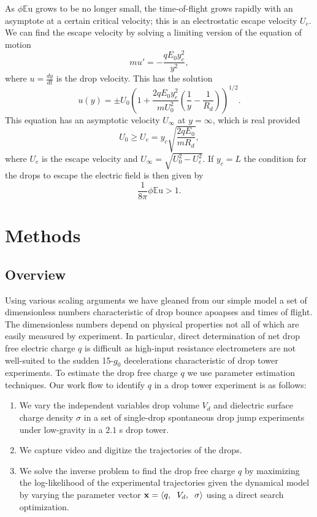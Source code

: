 \documentclass[aip,reprint, floatfix]{revtex4-1}
\begin{document}
As $\phi \mathbb{E}\mbox{u}$ grows to be no longer small, the time-of-flight grows rapidly with an asymptote at a certain critical velocity; this is an electrostatic escape velocity $U_e$. We can find the escape velocity by solving a limiting version of the equation of motion
\[ m u' = - \frac{q E_0 y_c^2}{y^2}, \]
where $u = \frac{d y}{d t}$ is the drop velocity. This has the solution
\[ u(y) = \pm U_0 \left(1 + \frac{2q E_0 y_c^2}{m U_0^2} \left( \frac{1}{y} - \frac{1}{R_d} \right) \right)^{1/2}.
\]
This equation has an asymptotic velocity $U_{\infty}$ at $y = \infty$, which is real provided 
\[ U_0 \geq  U_e = y_c \sqrt{\frac{2 q E_0 }{m R_d}},
\]
where $U_e$ is the escape velocity and $U_{\infty} = \sqrt{U_0^2 - U_e^2}$. If $y_c=L$ the condition for the drops to escape the electric field is then given by
\begin{equation}\label{escape}
\frac{1}{8 \pi} \phi \mathbb{E}\mbox{u} > 1.
\end{equation}

\section{Methods}
\subsection{Overview}
Using various scaling arguments we have gleaned from our simple model a set of dimensionless numbers characteristic of drop bounce apoapses and times of flight. The dimensionless numbers depend on physical properties not all of which are easily measured by experiment. In particular, direct determination of net drop free electric charge $q$ is difficult as high-input resistance electrometers are not well-suited to the sudden 15-$g_0$ decelerations characteristic of drop tower experiments. To estimate the drop free charge $q$ we use parameter estimation techniques. Our work flow to identify $q$ in a drop tower experiment is as follows:
\begin{enumerate}
\item We vary the independent variables drop volume $V_d$ and dielectric surface charge density $\sigma$ in a set of single-drop spontaneous drop jump experiments under low-gravity in a $2.1$ s drop tower. 
\item We capture video and digitize the trajectories of the drops. 
\item We solve the inverse problem to find the drop free charge $q$ by maximizing the log-likelihood of the experimental trajectories given the dynamical model by varying the parameter vector $\mathbf{x} = \left\langle q, \hspace{2 mm} V_d, \hspace{2 mm} \sigma \right\rangle$ using a direct search optimization.                     
\end{enumerate}
\end{document}
